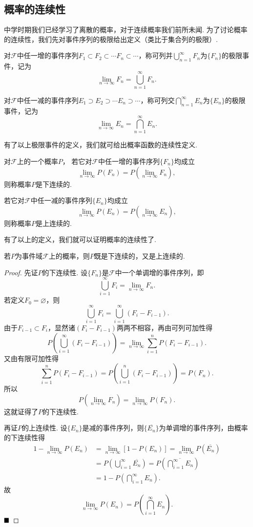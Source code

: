 \subsection{概率的连续性}
中学时期我们已经学习了离散的概率，对于连续概率我们前所未闻. 为了讨论概率的连续性，我们先对事件序列的极限给出定义（类比于集合列的极限）.
\begin{definition}[极限事件]
	对$\mathscr{F}$中任一增的事件序列$F_1\subset F_2\subset\cdots F_n\subset\cdots$，称可列并$\displaystyle\bigcup_{n=1}^{\infty}F_n$为$\{F_n\}$的{\heiti 极限事件}，记为
	$$\lim\limits_{n\to\infty}F_n=\bigcup_{n=1}^{\infty}F_n.$$
	
	对$\mathscr{F}$中任一减的事件序列$E_1\supset E_2\supset\cdots E_n\supset\cdots$，称可列交$\displaystyle\bigcap_{n=1}^{\infty}E_n$为$\{E_n\}$的{\heiti 极限事件}，记为
	$$\lim\limits_{n\to\infty}E_n=\bigcap_{n=1}^{\infty}E_n.$$
\end{definition}
有了以上极限事件的定义，我们就可给出概率函数的连续性定义.
\begin{definition}
	对$\mathscr{F}$上的一个概率$P$，
	若它对$\mathscr{F}$中任一增的事件序列$\{F_n\}$均成立
	$$\lim\limits_{n\to\infty}P(F_n)=P(\lim\limits_{n\to\infty}F_n),$$
	则称概率$P$是{\heiti 下连续}的.
	
	若它对$\mathscr{F}$中任一减的事件序列$\{E_n\}$均成立
	$$\lim\limits_{n\to\infty}P(E_n)=P(\lim\limits_{n\to\infty}E_n),$$
	则称概率$P$是{\heiti 上连续}的.
\end{definition}
有了以上的定义，我们就可以证明概率的连续性了.
\begin{theorem}[概率的连续性]
	若$P$为事件域$\mathscr{F}$上的概率，则$P$既是下连续的，又是上连续的.
\end{theorem}
\begin{proof}
	先证$P$的下连续性. 设$\{F_n\}$是$\mathscr{F}$中一个单调增的事件序列，即
	$$\bigcup_{i=1}^{\infty}F_i=\lim\limits_{n\to\infty}F_n.$$
	若定义$F_0=\varnothing$，则
	$$\bigcup_{i=1}^{\infty}F_i=\bigcup_{i=1}^{\infty}(F_i-F_{i-1}).$$
	由于$F_{i-1}\subset F_{i}$，显然诸$(F_i-F_{i-1})$两两不相容，再由可列可加性得
	$$P\left(\bigcup_{i=1}^{\infty}(F_i-F_{i-1})\right)=\lim\limits_{n\to\infty}\sum_{i=1}^{n}P(F_i-F_{i-1}).$$
	又由有限可加性得
	$$\sum_{i=1}^{n}P(F_i-F_{i-1})=P\left(\bigcup_{i=1}^{n}(F_i-F_{i-1})\right)=P(F_n).$$
	所以
	$$P(\lim\limits_{n\to\infty}F_n)=\lim\limits_{n\to\infty}P(F_n).$$
	这就证得了$P$的下连续性.
	
	再证$P$的上连续性. 设$\{E_n\}$是减的事件序列，则$\{\overline{E_n}\}$为单调增的事件序列，由概率的下连续性得
	\begin{align*}
		1-\lim\limits_{n\to\infty}P(E_n)
		&=\lim\limits_{n\to\infty}\left[1-P(E_n)\right]=\lim\limits_{n\to\infty}P(\overline{E_n})\\
		&=P\left(\bigcup_{i=1}^{\infty}\overline{E_n}\right)=P\left(\overline{\bigcap_{i=1}^{\infty}E_n}\right)\\
		&=1-P\left(\bigcap_{i=1}^{\infty}E_n\right).
	\end{align*}
	故
	$$\lim\limits_{n\to\infty}P(E_n)=P\left(\bigcap_{i=1}^{\infty}E_n\right).$$
	$\hfill\blacksquare$
\end{proof}
